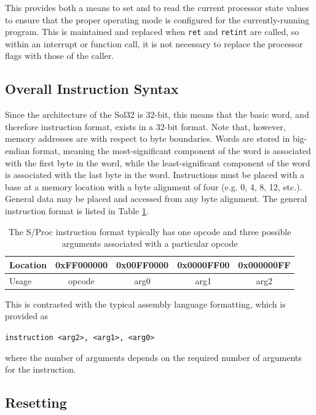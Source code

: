 \documentclass{article}
\begin{document}
This provides both a means to set and to read the current processor state values to ensure that the proper operating mode is configured for the currently-running program. \alert{This is maintained and replaced} when \texttt{ret} and \texttt{retint} are called, so within an interrupt or function call, it is not necessary to replace the processor flags with those of the caller.

\subsection{Overall Instruction Syntax}

Since the architecture of the Sol32 is 32-bit, this means that the basic word, and therefore instruction format, exists in a 32-bit format. Note that, however, memory addresses are with respect to byte boundaries. Words are stored in big-endian format, meaning the most-significant component of the word is associated with the first byte in the word, while the least-significant component of the word is associated with the last byte in the word. Instructions must be placed with a base at a memory location with a byte alignment of four (e.g. 0, 4, 8, 12, etc.). General data may be placed and accessed from any byte alignment. The general instruction format is listed  in Table \ref{table:instruction-formatting}.

\begin{table}[h!]
    \centering
    \begin{tabular}{l|cccc}
        \hline
        Location & 0xFF000000 & 0x00FF0000 & 0x0000FF00 & 0x000000FF \\
        \hline
        Usage & opcode & arg0 & arg1 & arg2 \\
        \hline
    \end{tabular}
    \caption{The S/Proc instruction format typically has one opcode and three possible arguments associated with a particular opcode}
    \label{table:instruction-formatting}
\end{table}

This is contrasted with the typical assembly language formatting, which is provided as

\begin{center}
    \texttt{instruction <arg2>, <arg1>, <arg0>}
\end{center}

where the number of arguments depends on the required number of arguments for the instruction.

\subsection{Resetting}
\end{document}
